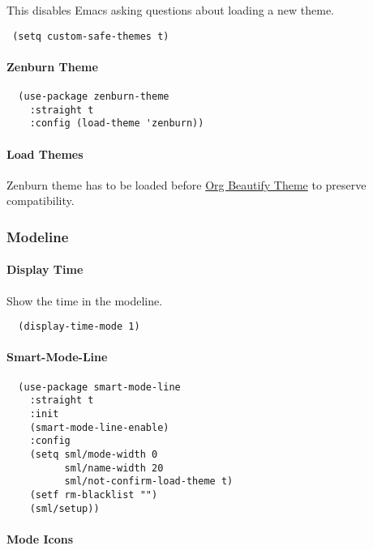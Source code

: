 \documentclass[11pt]{article}
\begin{document}
This disables Emacs asking questions about loading a new theme.

\begin{verbatim}
 (setq custom-safe-themes t)
\end{verbatim}


\paragraph*{Zenburn Theme}
\label{sec:org735d108}

\begin{verbatim}
  (use-package zenburn-theme
    :straight t
    :config (load-theme 'zenburn))
\end{verbatim}

\paragraph*{Load Themes}
\label{sec:org02f05c6}

Zenburn theme has to be loaded before \hyperref[org-beautify-theme]{Org Beautify Theme} to preserve compatibility.

\subsubsection*{Modeline}
\label{sec:orga13267f}
\paragraph*{Display Time}
\label{sec:orga850998}

Show the time in the modeline.

\begin{verbatim}
  (display-time-mode 1)
\end{verbatim}

\paragraph*{Smart-Mode-Line}
\label{sec:org51bb720}

\begin{verbatim}
  (use-package smart-mode-line
    :straight t
    :init
    (smart-mode-line-enable)
    :config
    (setq sml/mode-width 0
          sml/name-width 20
          sml/not-confirm-load-theme t)
    (setf rm-blacklist "")
    (sml/setup))
\end{verbatim}

\paragraph*{Mode Icons}
\label{sec:orgaf77438}
\end{document}
